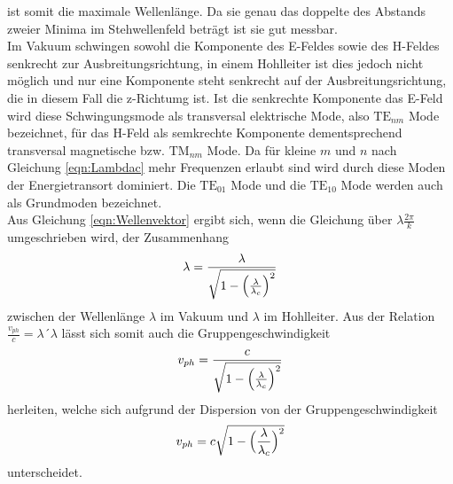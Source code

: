 ist somit die maximale Wellenlänge. Da sie genau das doppelte des Abstands zweier Minima im Stehwellenfeld
beträgt ist sie gut messbar. \\
Im Vakuum schwingen sowohl die Komponente des E-Feldes sowie des H-Feldes senkrecht zur Ausbreitungsrichtung, in
einem Hohlleiter ist dies jedoch nicht möglich und nur eine Komponente steht senkrecht auf der Ausbreitungsrichtung,
die in diesem Fall die z-Richtumg ist. Ist die senkrechte Komponente das E-Feld wird diese Schwingungsmode
als transversal elektrische Mode, also $\text{TE}_{nm}$ Mode bezeichnet, für das H-Feld als semkrechte
Komponente dementsprechend transversal magnetische bzw. $\text{TM}_{nm}$ Mode. Da für kleine
$m$ und $n$ nach Gleichung \ref{eqn:Lambdac} mehr Frequenzen erlaubt sind wird durch diese Moden der Energietransort
dominiert. Die $\text{TE}_{01}$ Mode und die $\text{TE}_{10}$ Mode werden auch als Grundmoden
bezeichnet. \\
Aus Gleichung \ref{eqn:Wellenvektor} ergibt sich, wenn die Gleichung über $\lambda\frac{2\pi}{k}$
umgeschrieben wird, der Zusammenhang
\begin{equation}
  \lambda=\frac{\lambda}{\sqrt{1-\Bigl(\frac{\lambda}{\lambda_c}\Bigr)^2}}
  \label{eqn:zsmhl}
\end{equation}
zwischen der Wellenlänge $\lambda$ im Vakuum und $\lambda $ im Hohlleiter.
Aus der Relation $\frac{v_{ph}}{c}={\lambda´}{\lambda}$ lässt sich somit auch die Gruppengeschwindigkeit
\begin{equation}
  v_{ph}=\frac{c}{\sqrt{1-\Bigl(\frac{\lambda}{\lambda_c}\Bigr)^2}}
  \label{eqn:vphase}
\end{equation}
herleiten, welche sich aufgrund der Dispersion von der Gruppengeschwindigkeit
\begin{equation}
    v_{ph}=c\sqrt{1-\Bigl(\frac{\lambda}{\lambda_c}\Bigr)^2}
  \label{eqn:vgruppe}
\end{equation}
unterscheidet.

